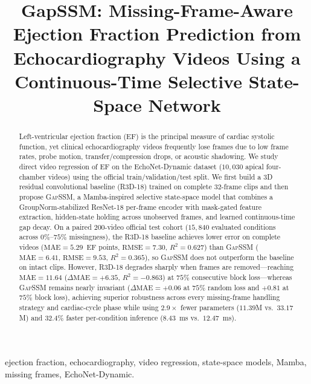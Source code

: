 \documentclass[conference]{IEEEtran}
\begin{document}
\title{GapSSM: Missing-Frame-Aware Ejection Fraction Prediction from Echocardiography Videos Using a Continuous-Time Selective State-Space Network}

\author{
}

\maketitle

\begin{abstract}
Left-ventricular ejection fraction (EF) is the principal measure of cardiac systolic function, yet clinical echocardiography videos frequently lose frames due to low frame rates, probe motion, transfer/compression drops, or acoustic shadowing. We study direct video regression of EF on the EchoNet-Dynamic dataset ($10,030$ apical four-chamber videos) using the official train/validation/test split. We first build a 3D residual convolutional baseline (R3D-18) trained on complete $32$-frame clips and then propose \textsc{GapSSM}, a Mamba-inspired selective state-space model that combines a GroupNorm-stabilized ResNet-18 per-frame encoder with mask-gated feature extraction, hidden-state holding across unobserved frames, and learned continuous-time gap decay. On a paired $200$-video official test cohort ($15,840$ evaluated conditions across $0\%$--$75\%$ missingness), the R3D-18 baseline achieves lower error on complete videos ($\text{MAE}=5.29$~EF points, $\text{RMSE}=7.30$, $R^2=0.627$) than \textsc{GapSSM} ($\text{MAE}=6.41$, $\text{RMSE}=9.53$, $R^2=0.365$), so \textsc{GapSSM} does not outperform the baseline on intact clips. However, R3D-18 degrades sharply when frames are removed—reaching $\text{MAE}=11.64$ ($\Delta\text{MAE}=+6.35$, $R^2=-0.863$) at $75\%$ consecutive block loss—whereas \textsc{GapSSM} remains nearly invariant ($\Delta\text{MAE}=+0.06$ at $75\%$ random loss and $+0.81$ at $75\%$ block loss), achieving superior robustness across every missing-frame handling strategy and cardiac-cycle phase while using $2.9\times$ fewer parameters ($11.39$M vs.\ $33.17$M) and $32.4\%$ faster per-condition inference ($8.43$~ms vs.\ $12.47$~ms).
\end{abstract}

\begin{IEEEkeywords}
ejection fraction, echocardiography, video regression, state-space models, Mamba, missing frames, EchoNet-Dynamic.
\end{IEEEkeywords}
\end{document}
